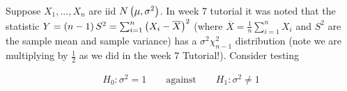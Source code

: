 \documentclass[12pt, a4paper]{article}\usepackage[]{graphicx}\usepackage[]{color}
\begin{document}


\pagestyle{default}
\thispagestyle{empty}

\newpage
\setcounter{page}{1}
{\centering {}

}
Suppose $X_1, ..., X_n$ are iid $N\left(\mu, \sigma^2\right)$. In week 7 tutorial it was noted that the statistic $Y = \left(n - 1\right)S^2 = \sum_{i = 1}^n\left(X_i - \overline{X}\right)^2$ (where $\overline{X} = \frac{1}{n}\sum_{i = 1}^nX_i$ and $S^2$ are the sample mean and sample variance) has a $\sigma^2\chi_{n - 1}^2$ distribution (note we are  multiplying by $\frac{1}{2}$ as we did in the week 7 Tutorial!). Consider testing

\begin{align}
H_0: \sigma^2 = 1 \qquad\text{against}\qquad H_1:\sigma^2 \neq 1
\end{align}
\end{document}
